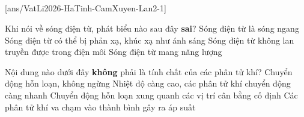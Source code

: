 \def\CheDo{solcolor}%
\def\tenchuong{THPT Cẩm Xuyên, Hà Tĩnh -- Lần 2}
\def\thuonghieu{VẬT LÍ 12 -- Eduzy.com.vn}
\def\TachCauDS{1}
\def\TachCauLG{1}


\newcommand{\CXdongthang}[4]{%
	\begin{scope}[shift={(#1,0)}]
		\draw[black!85,thick] (0,0)--(0,2);
		\draw[VLdo,VLmui,thick] (0,0.8)--(0,1.25);
		\node[VLdo] at (-0.32,1.65) {$I$};
		#2{-0.55}{0.95}
		#3{0.55}{0.95}
		\node at (0,-0.3) {#4};
	\end{scope}}


	\noindent
	\subsection*{}
	\setcounter{ex}{0}
	[ans/VatLi2026-HaTinh-CamXuyen-Lan2-1]

	\begin{ex}%
		Khi nói về sóng điện từ, phát biểu nào sau đây \textbf{sai}?
		\choice
		{Sóng điện từ là sóng ngang}
		{Sóng điện từ có thể bị phản xạ, khúc xạ như ánh sáng}
		{\True Sóng điện từ không lan truyền được trong điện môi}
		{Sóng điện từ mang năng lượng}
	\end{ex}

	\begin{ex}%
		Nội dung nào dưới đây \textbf{không} phải là tính chất của các phân tử khí?
		\choice
		{Chuyển động hỗn loạn, không ngừng}
		{Nhiệt độ càng cao, các phân tử khí chuyển động càng nhanh}
		{\True Chuyển động hỗn loạn xung quanh các vị trí cân bằng cố định}
		{Các phân tử khí va chạm vào thành bình gây ra áp suất}
	\end{ex}

